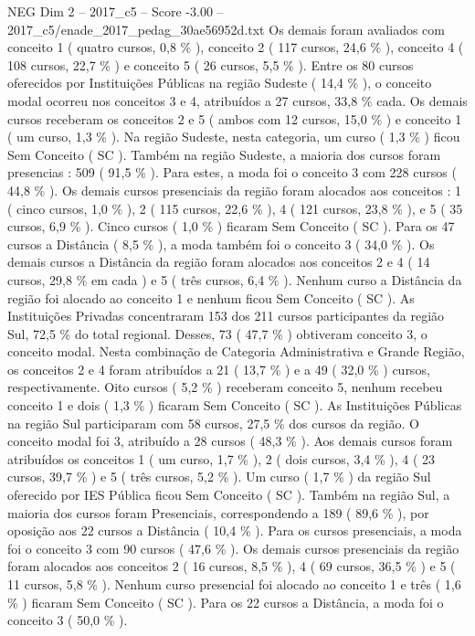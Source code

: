 \begin{textsample}{NEG Dim 2 – 2017\_c5 – Score -3.00 – 2017\_c5/enade\_2017\_pedag\_30ae56952d.txt}
Os demais foram avaliados com conceito 1 ( quatro cursos, 0,8 \% ), conceito 2 ( 117 cursos, 24,6 \% ), conceito 4 ( 108 cursos, 22,7 \% ) e conceito 5 ( 26 cursos, 5,5 \% ).
Entre os 80 cursos oferecidos por Instituições Públicas na região Sudeste ( 14,4 \% ), o conceito modal ocorreu nos conceitos 3 e 4, atribuídos a 27 cursos, 33,8 \% cada.
Os demais cursos receberam os conceitos 2 e 5 ( ambos com 12 cursos, 15,0 \% ) e conceito 1 ( um curso, 1,3 \% ).
Na região Sudeste, nesta categoria, um curso ( 1,3 \% ) ficou Sem Conceito ( SC ).
Também na região Sudeste, a maioria dos cursos foram presencias : 509 ( 91,5 \% ).
Para estes, a moda foi o conceito 3 com 228 cursos ( 44,8 \% ).
Os demais cursos presenciais da região foram alocados aos conceitos : 1 ( cinco cursos, 1,0 \% ), 2 ( 115 cursos, 22,6 \% ), 4 ( 121 cursos, 23,8 \% ), e 5 ( 35 cursos, 6,9 \% ).
Cinco cursos ( 1,0 \% ) ficaram Sem Conceito ( SC ).
Para os 47 cursos a Distância ( 8,5 \% ), a moda também foi o conceito 3 ( 34,0 \% ).
Os demais cursos a Distância da região foram alocados aos conceitos 2 e 4 ( 14 cursos, 29,8 \% em cada ) e 5 ( três cursos, 6,4 \% ).
Nenhum curso a Distância da região foi alocado ao conceito 1 e nenhum ficou Sem Conceito ( SC ).
As Instituições Privadas concentraram 153 dos 211 cursos participantes da região Sul, 72,5 \% do total regional.
Desses, 73 ( 47,7 \% ) obtiveram conceito 3, o conceito modal.
Nesta combinação de Categoria Administrativa e Grande Região, os conceitos 2 e 4 foram atribuídos a 21 ( 13,7 \% ) e a 49 ( 32,0 \% ) cursos, respectivamente.
Oito cursos ( 5,2 \% ) receberam conceito 5, nenhum recebeu conceito 1 e dois ( 1,3 \% ) ficaram Sem Conceito ( SC ).
As Instituições Públicas na região Sul participaram com 58 cursos, 27,5 \% dos cursos da região.
O conceito modal foi 3, atribuído a 28 cursos ( 48,3 \% ).
Aos demais cursos foram atribuídos os conceitos 1 ( um curso, 1,7 \% ), 2 ( dois cursos, 3,4 \% ), 4 ( 23 cursos, 39,7 \% ) e 5 ( três cursos, 5,2 \% ).
Um curso ( 1,7 \% ) da região Sul oferecido por IES Pública ficou Sem Conceito ( SC ).
Também na região Sul, a maioria dos cursos foram Presenciais, correspondendo a 189 ( 89,6 \% ), por oposição aos 22 cursos a Distância ( 10,4 \% ).
Para os cursos presenciais, a moda foi o conceito 3 com 90 cursos ( 47,6 \% ).
Os demais cursos presenciais da região foram alocados aos conceitos 2 ( 16 cursos, 8,5 \% ), 4 ( 69 cursos, 36,5 \% ) e 5 ( 11 cursos, 5,8 \% ).
Nenhum curso presencial foi alocado ao conceito 1 e três ( 1,6 \% ) ficaram Sem Conceito ( SC ).
Para os 22 cursos a Distância, a moda foi o conceito 3 ( 50,0 \% ).

\end{textsample}

